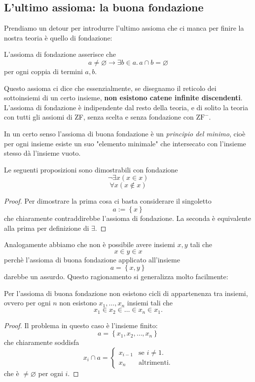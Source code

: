 \documentclass[11pt]{scrartcl}
\newcommand{\eset}{\varnothing}
\begin{document}
 	\subsection{L'ultimo assioma: la buona fondazione}
 	Prendiamo un detour per introdurre l'ultimo assioma che ci manca per finire la nostra teoria è quello di fondazione:
 	\begin{definition}
 		L'assioma di fondazione asserisce che
 		$$a\ne \eset \to \exists b\in a.\, a\cap b=\eset$$
 		per ogni coppia di termini $a,b$.
 	\end{definition}
 	Questo assioma ci dice che essenzialmente, se disegnamo il reticolo dei sottoinsiemi di un certo insieme, \textbf{non esistono catene infinite discendenti}. L'assioma di fondazione è indipendente dal resto della teoria, e di solito la teoria con tutti gli assiomi di ZF, senza scelta e senza fondazione con $\text{ZF}^-$.
 	\begin{remark}
 		In un certo senso l'assioma di buona fondazione è un \textit{principio del minimo}, cioè per ogni insieme esiste un suo "elemento minimale" che intersecato con l'insieme stesso dà l'insieme vuoto. 
 	\end{remark}
 	\begin{corollary}
 		Le seguenti proposizioni sono dimostrabili con fondazione
 		$$\lnot \exists x\left(x\in x\right)$$
 		$$\forall x\left(x\not\in x\right)$$
 	\end{corollary}
 	\begin{proof}
 		Per dimostrare la prima cosa ci basta considerare il singoletto
 		$$a:=\left\{x\right\}$$
 		che chiaramente contraddirebbe l'assioma di fondazione. La seconda è equivalente alla prima per definizione di $\exists$.
 	\end{proof}
 	Analogamente abbiamo che non è possibile avere insiemi $x,y$ tali che
 	$$x\in y\in x$$
 	perchè l'assioma di buona fondazione applicato all'insieme 
 	$$a=\left\{x,y\right\}$$
 	darebbe un assurdo. Questo ragionamento si generalizza molto facilmente:
 	\begin{corollary}
 		Per l'assioma di buona fondazione non esistono cicli di appartenenza tra insiemi, ovvero per ogni $n$ non esistono $x_1,\dots,x_n$ insiemi tali che
 		$$x_1\in x_2\in \dots \in x_n\in x_1.$$
 	\end{corollary}
 	\begin{proof}
 		Il problema in questo caso è l'insieme finito:
 		$$a=\left\{x_1,x_2,\dots,x_n\right\}$$
 		che chiaramente soddisfa
 		$$x_i\cap a=
 		\begin{cases}
 			x_{i-1}& \text{se $i\ne 1$.} \\
 			x_n & \text{altrimenti.}
 		\end{cases}
 		$$
 		che è $\ne \eset$ per ogni $i$.
 	\end{proof}
\end{document}
